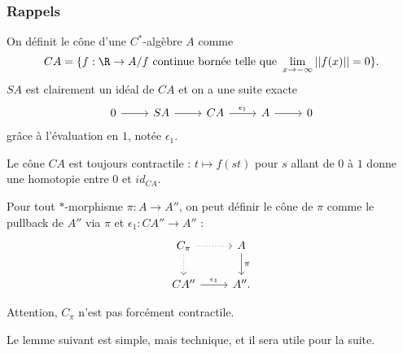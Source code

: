 \subsubsection{Rappels}

\begin{definition}
On définit le cône d'une $C^*$-algèbre $A$ comme 
\[CA= \{f:\R \rightarrow A / f \ \text{continue bornée telle que }\lim_{x\rightarrow -\infty} ||f(x)||=0\}.\]
$SA$ est clairement un idéal de $CA$ et on a une suite exacte 
\[\begin{tikzcd} 0\arrow{r} & SA \arrow{r}& CA \arrow{r}{\epsilon_1} & A \arrow{r} & 0\end{tikzcd}\]
grâce à l'évaluation en $1$, notée $\epsilon_1$.\\
\end{definition}

Le cône $CA$ est toujours contractile : $t\mapsto f(st)$ pour $s$ allant de $0$ à $1$ donne une homotopie entre $0$ et $id_{CA}$.\\

\begin{definition}
Pour tout $*$-morphisme $\pi: A\rightarrow A''$, on peut définir le cône de $\pi$ comme le pullback de $A''$ via $\pi$ et 
$\epsilon_1 : CA''\rightarrow A''$ :
\[\begin{tikzcd}
C_\pi \arrow[dotted]{r}\arrow[dotted]{d}& A \arrow{d}{\pi} \\
CA'' \arrow{r}{\epsilon_1} & A''.
\end{tikzcd}\]
\end{definition}
Attention, $C_\pi$ n'est pas forcément contractile.

Le lemme suivant est simple, mais technique, et il sera utile pour la suite.

